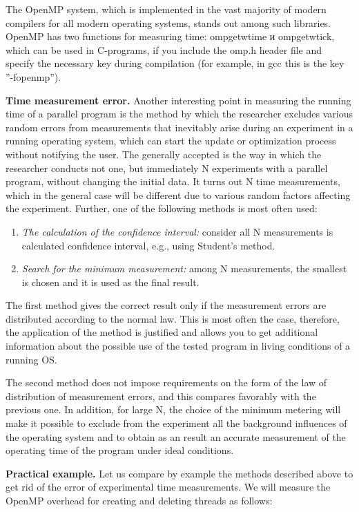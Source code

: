 {	\par The OpenMP system, which is implemented in the vast majority of modern compilers for all modern operating systems, stands out among such libraries. OpenMP has two functions for measuring time: omp\textunderscore get\textunderscore wtime и omp\textunderscore get\textunderscore wtick, which can be used in C-programs, if you include the omp.h header file and specify the necessary key during compilation (for example, in gcc this is the key ''-fopenmp'').
	\par\textbf{Time measurement error.} Another interesting point in measuring the running time of a parallel program is the method by which the researcher excludes various random errors from measurements that inevitably arise during an experiment in a running operating system, which can start the update or optimization process without notifying the user. The generally accepted is the way in which the researcher conducts not one, but immediately N experiments with a parallel program, without changing the initial data. It turns out N time measurements, which in the general case will be different due to various random factors affecting the experiment. Further, one of the following methods is most often used:
	\begin{enumerate}
		\item\textit{The calculation of the confidence interval:} consider all N measurements is calculated confidence interval, e.g., using Student's method.
		\item\textit{Search for the minimum measurement:} among N measurements, the smallest is chosen and it is used as the final result.
	\end{enumerate}
	\par The first method gives the correct result only if the measurement errors are distributed according to the normal law. This is most often the case, therefore, the application of the method is justified and allows you to get additional information about the possible use of the tested program in living conditions of a running OS.
	\par The second method does not impose requirements on the form of the law of distribution of measurement errors, and this compares favorably with the previous one. In addition, for large N, the choice of the minimum metering will make it possible to exclude from the experiment all the background influences of the operating system and to obtain as an result an accurate measurement of the operating time of the program under ideal conditions.
	\par\textbf{Practical example.} Let us compare by example the methods described above to get rid of the error of experimental time measurements. We will measure the OpenMP overhead for creating and deleting threads as follows:
}
